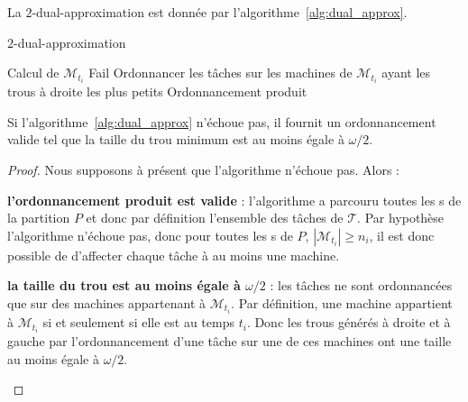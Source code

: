 \documentclass[a4paper,9pt]{article}
\begin{document}
La $2$-dual-approximation est donnée par l'algorithme~\ref{alg:dual_approx}.

\begin{algorithm}
    \caption{\unitfisched{} $2$-dual-approximation}
    \label{alg:dual_approx}
    \begin{algorithmic}[1]
            \State Calcul de $\mathcal{M}_{t_i}$
                \State \Return Fail
            \EndIf
            \State Ordonnancer les tâches sur les machines de $\mathcal{M}_{t_i}$ ayant les trous à
            droite les plus petits
        \EndFor
        \Return Ordonnancement produit
    \end{algorithmic}
\end{algorithm}

\begin{nthrm}
    Si l'algorithme~\ref{alg:dual_approx} n'échoue pas, il fournit un ordonnancement valide tel que
    la taille du trou minimum est au moins égale à $\omega / 2$.
\end{nthrm}

\begin{proof}
    Nous supposons à présent que l'algorithme n'échoue pas. Alors :
    \begin{bitemize}
        \item\textbf{l'ordonnancement produit est valide} : l'algorithme a parcouru toutes les
            \tphase{}s de la partition $P$ et donc par définition l'ensemble des tâches de
            $\mathcal{T}$. Par hypothèse l'algorithme n'échoue pas, donc pour toutes les
            \tphase{}s de $P$, $|\mathcal{M}_{t_i}| \geq n_i$, il est donc possible de d'affecter
            chaque tâche à au moins une machine.
        \item\textbf{la taille du trou est au moins égale à $\omega / 2$} : les tâches ne sont ordonnancées
            que sur des machines appartenant à $\mathcal{M}_{t_i}$. Par définition, une machine
            appartient à $\mathcal{M}_{t_i}$ si et seulement si elle est
             au temps $t_i$. Donc les trous générés à droite et à gauche
            par l'ordonnancement d'une tâche sur une de ces machines ont une taille au moins égale à
            $\omega / 2$.
    \end{bitemize}
\end{proof}
\end{document}
